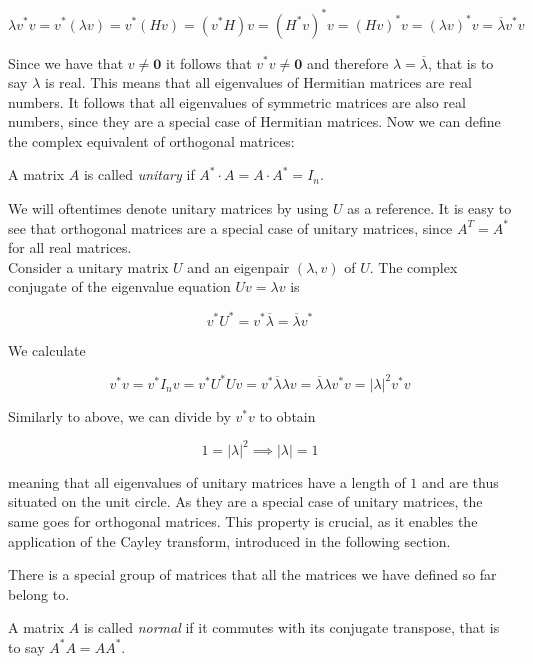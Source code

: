 \[
    \lambda v^* v = v^* \left( \lambda v \right)
    = v^* \left( H v \right)
    = \left(v^* H \right) v
    = \left( H^* v \right)^* v
    = \left( H v \right)^* v
    = (\lambda v)^* v
    = \overline{\lambda} v^* v
\]

Since we have that $v \neq \mathbf{0}$ it follows that $v^* v \neq \mathbf{0}$
and therefore $\lambda = \overline{\lambda}$, that is to say $\lambda$ is real.
This means that all eigenvalues of Hermitian matrices are real numbers.
It follows that all eigenvalues of symmetric matrices are also real numbers,
since they are a special case of Hermitian matrices.
Now we can define the complex equivalent of orthogonal matrices:

\begin{definition}
    A matrix $A$ is called \emph{unitary} if $A^* \cdot A = A \cdot A^* = I_n$.
\end{definition}

We will oftentimes denote unitary matrices by using $U$ as a reference.
It is easy to see that orthogonal matrices are a special case of unitary matrices,
since $A^T = A^*$ for all real matrices.\\
Consider a unitary matrix $U$ and an eigenpair $(\lambda, v)$ of $U$.
The complex conjugate of the eigenvalue equation $U v = \lambda v$ is

\[
    v^* U^* = v^* \overline{\lambda} = \overline{\lambda} v^*
\]

We calculate

\[
    v^* v = v^* I_n v = v^* U^* U v = v^* \overline{\lambda} \lambda v = \overline{\lambda} \lambda v^* v = \left| \lambda \right|^2 v^* v
\]

Similarly to above, we can divide by $v^* v$ to obtain

\begin{equation} \label{eq:unitary_eigenvalues}
    1 = \left| \lambda \right|^2 \implies \left| \lambda \right| = 1
\end{equation}

meaning that all eigenvalues of unitary matrices have a length of $1$ and are thus situated on the unit circle.
As they are a special case of unitary matrices, the same goes for orthogonal matrices.
This property is crucial, as it enables the application of the Cayley transform,
introduced in the following section.

There is a special group of matrices that all the matrices we have defined so far belong to.

\begin{definition}
    A matrix $A$ is called \emph{normal} if it commutes with its conjugate transpose,
    that is to say $A^* A = A A^*$.
\end{definition}

